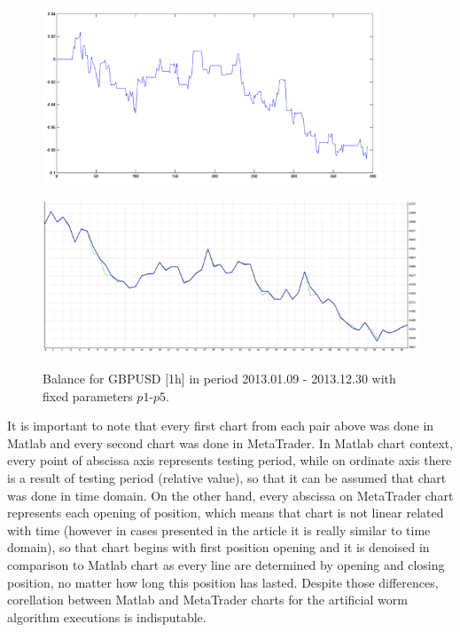 \documentclass[runningheads,a4paper]{llncs}
\begin{document}
\begin{figure}[h!]
\begin{minipage}{0.49\textwidth}
\centering
\includegraphics[width = 0.9\textwidth]{figures/rys12.png}
\label{fig:fig12}
\end{minipage}
\begin{minipage}{0.49\textwidth}
\centering
\includegraphics[width = \textwidth]{figures/rys13.png}
\label{fig:fig13}
\end{minipage}
\caption{Balance for GBPUSD [1h] in period 2013.01.09 - 2013.12.30 with fixed parameters $p1$-$p5$.}
\end{figure}
\FloatBarrier
\vspace{-1em}
It is important to note that every first chart from each pair above was done in Matlab and every second chart was done in MetaTrader. In Matlab chart context, every point of abscissa axis represents testing period, while on ordinate axis there is a result of testing period (relative value), so that it can be assumed that chart was done in time domain. On the other hand, every abscissa on MetaTrader chart represents each opening of position, which means that chart is not linear related with time (however in cases presented in the article it is really similar to time domain), so that chart begins with first position opening and it is denoised in comparison to Matlab chart as every line are determined by opening and closing position, no matter how long this position has lasted. Despite those differences, corellation between Matlab and MetaTrader charts for the artificial worm algorithm executions is indisputable.
\end{document}
